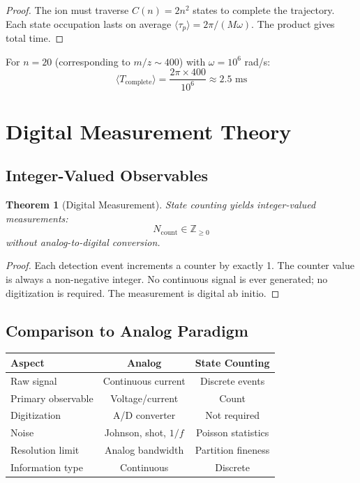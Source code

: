 \documentclass[twocolumn,10pt]{article}
\newtheorem{theorem}{Theorem}[section]
\begin{document}
\begin{proof}
The ion must traverse $C(n) = 2n^2$ states to complete the trajectory. Each state occupation lasts on average $\langle\tau_p\rangle = 2\pi/(M\omega)$. The product gives total time.
\end{proof}

For $n = 20$ (corresponding to $m/z \sim 400$) with $\omega = 10^6$ rad/s:
\begin{equation}
    \langle T_{\text{complete}} \rangle = \frac{2\pi \times 400}{10^6} \approx 2.5 \text{ ms}
\end{equation}

\section{Digital Measurement Theory}
\label{sec:digital}

\subsection{Integer-Valued Observables}

\begin{theorem}[Digital Measurement]
\label{thm:digital}
State counting yields integer-valued measurements:
\begin{equation}
    N_{\text{count}} \in \mathbb{Z}_{\geq 0}
\end{equation}
without analog-to-digital conversion.
\end{theorem}

\begin{proof}
Each detection event increments a counter by exactly 1. The counter value is always a non-negative integer. No continuous signal is ever generated; no digitization is required. The measurement is digital ab initio.
\end{proof}

\subsection{Comparison to Analog Paradigm}

\begin{center}
\begin{tabular}{lcc}
\toprule
\textbf{Aspect} & \textbf{Analog} & \textbf{State Counting} \\
\midrule
Raw signal & Continuous current & Discrete events \\
Primary observable & Voltage/current & Count \\
Digitization & A/D converter & Not required \\
Noise & Johnson, shot, $1/f$ & Poisson statistics \\
Resolution limit & Analog bandwidth & Partition fineness \\
Information type & Continuous & Discrete \\
\bottomrule
\end{tabular}
\end{center}
\end{document}
